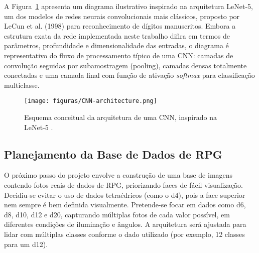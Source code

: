 A Figura~\ref{fig:modelo-cnn} apresenta um diagrama ilustrativo inspirado na arquitetura LeNet-5, 
um dos modelos de redes neurais convolucionais mais clássicos, proposto por LeCun et al. (1998) para 
reconhecimento de dígitos manuscritos. Embora a estrutura exata da rede implementada neste trabalho difira em 
termos de parâmetros, profundidade e dimensionalidade das entradas, o diagrama é representativo do fluxo de 
processamento típico de uma CNN: camadas de convolução seguidas por subamostragem (pooling), camadas densas 
totalmente conectadas e uma camada final com função de ativação \textit{softmax} para classificação multiclasse.

\begin{figure}[H]
    \centering
    \texttt{[image: figuras/CNN-architecture.png]}
    \caption{Esquema conceitual da arquitetura de uma CNN, inspirado na LeNet-5 \cite{lecun1998gradient}.}
    \label{fig:modelo-cnn}
\end{figure}


\subsection{Planejamento da Base de Dados de RPG}

O próximo passo do projeto envolve a construção de uma base de imagens contendo fotos reais de dados de RPG, 
priorizando faces de fácil visualização. Decidiu-se evitar o uso de dados tetraédricos (como o d4), 
pois a face superior nem sempre é bem definida visualmente. Pretende-se focar em dados 
como d6, d8, d10, d12 e d20, capturando múltiplas fotos de cada valor possível, em diferentes condições 
de iluminação e ângulos. A arquitetura será ajustada para lidar com múltiplas classes conforme o dado 
utilizado (por exemplo, 12 classes para um d12).

